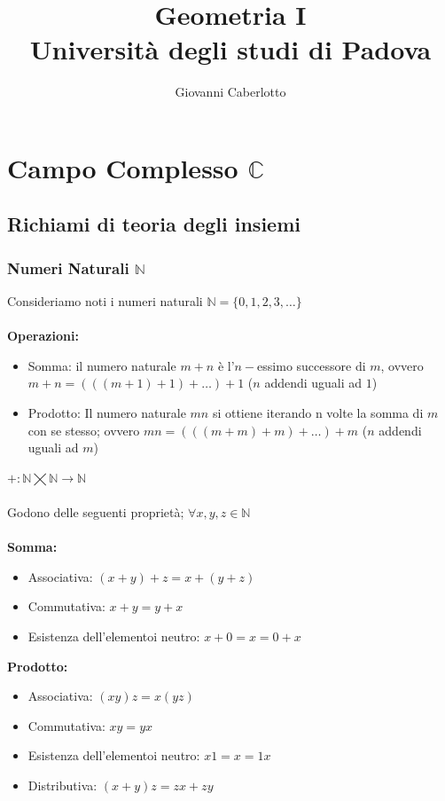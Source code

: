 \documentclass{report}
\title{\Huge{Geometria I}\\Università degli studi di Padova}
\author{\huge{Giovanni Caberlotto}}
\date{}
\begin{document}
\maketitle
\newpage%
\tableofcontents
\pagebreak

\chapter{Campo Complesso $\mathbb{C}$}
\section{Richiami di teoria degli insiemi}
\subsection{Numeri Naturali $\mathbb{N}$}
Consideriamo noti i numeri naturali $\mathbb{N} = \{0, 1, 2, 3, \dots\}$ 
\\ \\
\textbf{Operazioni:}
\begin{itemize}
    \item{Somma: il numero naturale $m + n$ è l'$n-$essimo successore di $m$, ovvero $m+n=(((m+1)+1)+\dots)+1$ ($n$ addendi uguali ad $1$)}
    \item{Prodotto: Il numero naturale $mn$ si ottiene iterando n volte la somma di $m$ con se stesso; ovvero $mn = (((m +m)+m)+\dots)+m$ ($n$ addendi uguali ad $m$)}
\end{itemize}
$+ : \mathbb{N} \varprod \mathbb{N} \rightarrow \mathbb{N}$
\\ \\
Godono delle seguenti proprietà; $\forall x, y, z \in \mathbb{N}$
\\ \\
\textbf{Somma:}
\begin{itemize}
    \item{Associativa: $(x + y) + z = x + (y + z)$}
    \item{Commutativa: $x + y = y + x$}
    \item{Esistenza dell'elementoi neutro: $x + 0 = x = 0 + x$}
\end{itemize}
\textbf{Prodotto:}
\begin{itemize}
    \item{Associativa: $(xy)z = x(yz)$}
    \item{Commutativa: $xy = yx$}
    \item{Esistenza dell'elementoi neutro: $x1 = x = 1x$}
    \item{Distributiva: $(x + y)z = zx + zy$}
\end{itemize}
\end{document}

